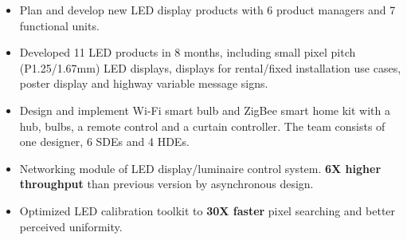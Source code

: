 \documentclass[11pt,a4paper]{moderncv}
\begin{document}
{
\begin{itemize}
	\item Plan and develop new LED display products with 6 product managers and 7 functional units.
	\item Developed 11 LED products in 8 months, including small pixel pitch (P1.25/1.67mm) LED displays, displays for rental/fixed installation use cases, poster display and highway variable message signs.
	\item Design and implement Wi-Fi smart bulb and ZigBee smart home kit with a hub, bulbs, a remote control and a curtain controller. The team consists of one designer, 6 SDEs and 4 HDEs.
\end{itemize}
}

{
\begin{itemize}
	\item Networking module of LED display/luminaire control system. \textbf{6X higher throughput} than previous version by asynchronous design.
	\item Optimized LED calibration toolkit to \textbf{30X faster} pixel searching and better perceived uniformity.
\end{itemize}
}

{
}
\end{document}
